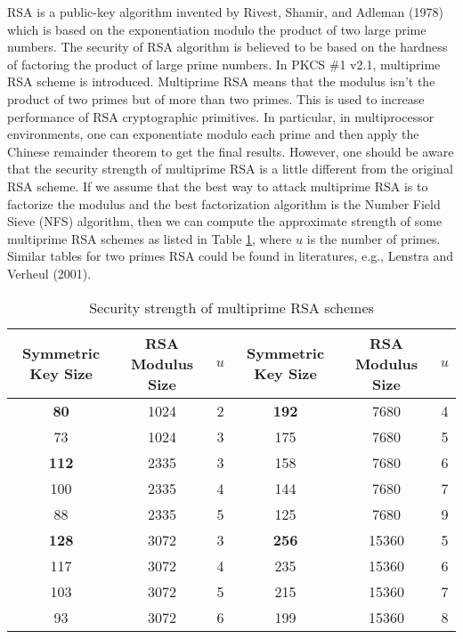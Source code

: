 \documentclass{article}
\begin{document}
RSA is a public-key algorithm invented by Rivest, Shamir, and Adleman (1978)
which is based on the exponentiation modulo the 
product of two large prime numbers. The security of RSA algorithm 
is believed to be based on the hardness of factoring the product of 
large prime numbers. In PKCS \#1 v2.1, multiprime RSA scheme is introduced. 
Multiprime RSA means that the modulus isn't
the product of two primes but of more than two primes.
This is used to increase performance of RSA cryptographic primitives.
In particular, in multiprocessor environments, one can
exponentiate modulo each prime and then apply the Chinese remainder theorem 
to get the final results. However, one should be aware that the security
strength of multiprime RSA is a little different from the original
RSA scheme. If we assume that the best way to attack multiprime RSA is to 
factorize the modulus and the best factorization algorithm is
the Number Field Sieve (NFS) algorithm, then we can compute 
the approximate strength of some multiprime RSA schemes as listed in 
Table \ref{stable}, where $u$ is the number of primes.
Similar tables for two primes RSA could be found in literatures,
e.g., Lenstra and Verheul (2001).
\begin{center}
\begin{table}[htb]
\caption{Security strength of multiprime RSA schemes}
\label{stable}
\begin{center}
\begin{tabular}{|c|c|c||c|c|c|} \hline
Symmetric Key Size & RSA Modulus Size & $u$&Symmetric Key Size& RSA 
Modulus Size & $u$ \\ \hline
{\bf 80} & 1024 & 2 & {\bf 192} & 7680 & 4   \\ \hline
73 & 1024 & 3 & 175 & 7680 & 5 \\ \hline
{\bf 112} & 2335 & 3 &158 & 7680 & 6 \\ \hline
100 & 2335 & 4& 144 & 7680 & 7\\ \hline
88 & 2335 & 5& 125 & 7680 & 9\\ \hline
{\bf 128} & 3072 & 3& {\bf 256} & 15360 & 5\\ \hline
117 & 3072 & 4&235 & 15360 & 6\\ \hline
103 & 3072 & 5& 215 & 15360 & 7\\ \hline
93 & 3072 & 6& 199 & 15360 & 8\\ \hline
\end{tabular}
\end{center}
\end{table}
\end{center}
\end{document}
